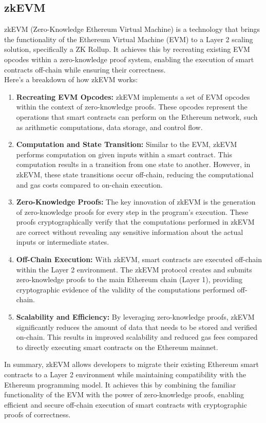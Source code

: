 \documentclass{report}
\begin{document}
\subsection{zkEVM}
zkEVM (Zero-Knowledge Ethereum Virtual Machine) is a technology that brings the functionality of the Ethereum Virtual Machine (EVM) to a Layer 2 scaling solution, specifically a ZK Rollup. It achieves this by recreating existing EVM opcodes within a zero-knowledge proof system, enabling the execution of smart contracts off-chain while ensuring their correctness.\\
Here's a breakdown of how zkEVM works:\\
\begin{enumerate}
	\item \textbf{Recreating EVM Opcodes:} zkEVM implements a set of EVM opcodes within the context of zero-knowledge proofs. These opcodes represent the operations that smart contracts can perform on the Ethereum network, such as arithmetic computations, data storage, and control flow.
	\item \textbf{Computation and State Transition:} Similar to the EVM, zkEVM performs computation on given inputs within a smart contract. This computation results in a transition from one state to another. However, in zkEVM, these state transitions occur off-chain, reducing the computational and gas costs compared to on-chain execution.
	\item \textbf{Zero-Knowledge Proofs:} The key innovation of zkEVM is the generation of zero-knowledge proofs for every step in the program's execution. These proofs cryptographically verify that the computations performed in zkEVM are correct without revealing any sensitive information about the actual inputs or intermediate states.
	\item \textbf{Off-Chain Execution:} With zkEVM, smart contracts are executed off-chain within the Layer 2 environment. The zkEVM protocol creates and submits zero-knowledge proofs to the main Ethereum chain (Layer 1), providing cryptographic evidence of the validity of the computations performed off-chain.
	\item \textbf{Scalability and Efficiency:} By leveraging zero-knowledge proofs, zkEVM significantly reduces the amount of data that needs to be stored and verified on-chain. This results in improved scalability and reduced gas fees compared to directly executing smart contracts on the Ethereum mainnet.
\end{enumerate}
In summary, zkEVM allows developers to migrate their existing Ethereum smart contracts to a Layer 2 environment while maintaining compatibility with the Ethereum programming model. It achieves this by combining the familiar functionality of the EVM with the power of zero-knowledge proofs, enabling efficient and secure off-chain execution of smart contracts with cryptographic proofs of correctness.
\end{document}
